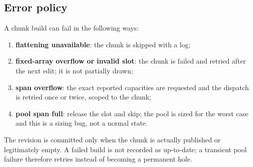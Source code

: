 \subsection{Error policy}

A chunk build can fail in the following ways:
\begin{enumerate}
\item \textbf{flattening unavailable}: the chunk is skipped with a log;
\item \textbf{fixed-array overflow or invalid slot}: the chunk is failed and
  retried after the next edit; it is not partially drawn;
\item \textbf{span overflow}: the exact reported capacities are requested
  and the dispatch is retried once or twice, scoped to the chunk;
\item \textbf{pool span full}: release the slot and skip; the pool is sized
  for the worst case and this is a sizing bug, not a normal state.
\end{enumerate}
The revision is committed only when the chunk is actually published or
legitimately empty.  A failed build is not recorded as up-to-date; a
transient pool failure therefore retries instead of becoming a permanent
hole.
